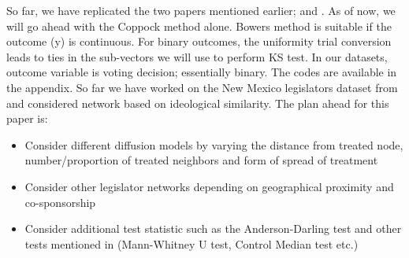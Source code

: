\documentclass[12pt]{article}
\begin{document}
So far, we have replicated the two papers mentioned earlier; \citep{bowers2012reasoning} and \citep{coppock2014information}. As of now, we will go ahead with the Coppock method alone. Bowers method is suitable if the outcome (y) is continuous. For binary outcomes, the uniformity trial conversion leads to ties in the sub-vectors we will use to perform KS test. In our datasets, outcome variable is voting decision; essentially binary. The codes are available in the appendix. So far we have worked on the New Mexico legislators dataset from \citep{butler2011can} and considered network based on ideological similarity. The plan ahead for this paper is:

\begin{itemize}

\item Consider different diffusion models by varying the distance from treated node, number/proportion of treated neighbors and form of spread of treatment
\item Consider other legislator networks depending on geographical proximity and co-sponsorship
\item Consider additional test statistic such as the Anderson-Darling test and other tests mentioned in \citep{rosenbaum2012interference} (Mann-Whitney U test, Control Median test etc.)

\end{itemize}
\end{document}
